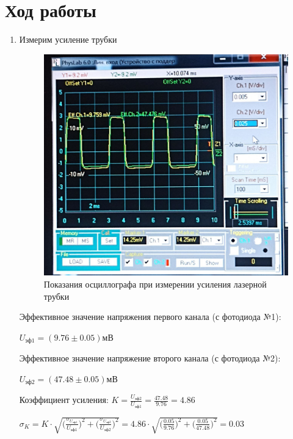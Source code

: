 \documentclass[a4paper,12pt]{article}
\begin{document}
\section{Ход работы}
\begin{enumerate}
    \item Измерим усиление трубки
    
    \begin{figure}[h]
    \centering
    \includegraphics[width=0.7\linewidth]{photo1.jpg}
    \caption{Показания осциллографа при измерении усиления лазерной трубки}
    \label{photo1}
    \end{figure}

    Эффективное значение напряжения первого канала (с фотодиода №1):
    
    $U_\text{эф1} = (9.76\pm0.05)\text{мВ}$
    
    Эффективное значение напряжение второго канала (с фотодиода №2):
    
    $U_\text{эф2} = (47.48\pm0.05)\text{мВ}$

    Коэффициент усиления: $K = \frac{U_\text{эф2}}{U_\text{эф1}} = \frac{47.48}{9.76}=4.86$

    $\sigma_K = K\cdot\sqrt{\Big(\frac{\sigma_{U_\text{эф1}}}{U_\text{эф1}}\Big)^2+\Big(\frac{\sigma_{U_\text{эф2}}}{U_\text{эф2}}\Big)^2} = 4.86\cdot\sqrt{\Big(\frac{0.05}{9.76}\Big)^2+\Big(\frac{0.05}{47.48}\Big)^2}=0.03$

    \begin{center}
    \end{center}
    

\end{enumerate}
\end{document}
